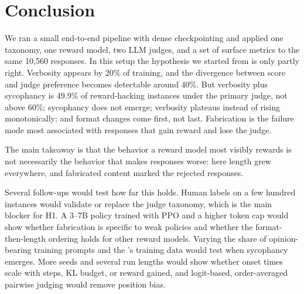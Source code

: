 \section{Conclusion}
\label{sec:conclusion}

We ran a small end-to-end \rlhf pipeline with dense checkpointing and applied one taxonomy, one reward model, two LLM judges, and a set of surface metrics to the same 10,560 responses.
In this setup the hypothesis we started from is only partly right.
Verbosity appears by 20\% of training, and the divergence between \rmodel score and judge preference becomes detectable around 40\%.
But verbosity plus sycophancy is 49.9\% of reward-hacking instances under the primary judge, not above 60\%; sycophancy does not emerge; verbosity plateaus instead of rising monotonically; and format changes come first, not last.
Fabrication is the failure mode most associated with responses that gain reward and lose the judge.

The main takeaway is that the behavior a reward model most visibly rewards is not necessarily the behavior that makes responses worse: here length grew everywhere, and fabricated content marked the rejected responses.

Several follow-ups would test how far this holds.
Human labels on a few hundred instances would validate or replace the judge taxonomy, which is the main blocker for H1.
A 3--7B policy trained with PPO and a higher token cap would show whether fabrication is specific to weak policies and whether the format-then-length ordering holds for other reward models.
Varying the share of opinion-bearing training prompts and the \rmodel's training data would test when sycophancy emerges.
More seeds and several run lengths would show whether onset times scale with steps, KL budget, or reward gained, and logit-based, order-averaged pairwise judging would remove position bias.
